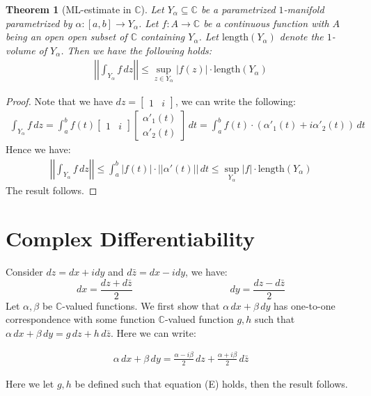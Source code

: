 \documentclass[11pt,oneside]{book}
\theoremstyle{break}
\theoremstyle{break}
\newtheorem{thm}{Theorem}[section]
\newcommand{\Complex}{\mathbb{C}}
\newcommand{\bmat}[1]{\begin{bmatrix} #1 \end{bmatrix}}
\begin{document}
\begin{thm}[ML-estimate in $\Complex$]
Let $Y_\alpha \subseteq \Complex$ be a parametrized $1$-manifold parametrized by $\alpha:[a,b] \to Y_\alpha$. Let $f:A \to \Complex$ be a continuous function with $A$ being an open open subset of $\Complex$ containing $Y_\alpha$. Let $\text{length}(Y_\alpha)$ denote the $1$-volume of $Y_\alpha$. Then we have the following holds:
\begin{align*}
\left|\left|\int_{Y_\alpha} f\, dz \right|\right| \leq \sup_{z \in Y_\alpha} |f(z)| \cdot \text{length}(Y_\alpha)
\end{align*}
\end{thm}
\begin{proof}
Note that we have $dz = \bmat{1&i}$, we can write the following:
\begin{align*}
\int_{Y_\alpha} f\, dz = \int_a^b f(t) \bmat{1 & i} \bmat{\alpha'_1(t) \\ \alpha'_2(t)} \, dt = \int_a^b f(t)\cdot (\alpha'_1(t) + i \alpha'_2(t))\, dt
\end{align*}
Hence we have:
\begin{align*}
\left|\left|\int_{Y_\alpha} f\, dz\right|\right| \leq \int_a^b |f(t)|\cdot ||\alpha'(t)||\, dt \leq \sup_{Y_\alpha} |f| \cdot \text{length}(Y_\alpha)
\end{align*}
The result follows.
\end{proof}



\newpage
\section[Complex Differentiability]{\color{red}Complex Differentiability\color{black}}

Consider $dz = dx+idy$ and $d\bar{z} = dx-idy$, we have: 
$$dx = \frac{dz+d\bar{z}}{2}\qquad\qquad\qquad\qquad\qquad dy = \frac{dz - d\bar{z}}{2}$$ 
Let $\alpha,\beta$ be $\Complex$-valued functions. We first show that $\alpha\, dx + \beta\, dy $ has one-to-one correspondence with some function $\Complex$-valued function $g,h$ such that $\alpha\, dx + \beta\, dy = g\, dz + h\, d\bar{z}$. Here we can write:

\begin{align*}
\alpha\, dx + \beta\, dy = \frac{\alpha-i\beta}{2} \, dz + \frac{\alpha + i\beta}{2}\, d\bar{z} \tag{E}
\end{align*}

Here we let $g,h$ be defined such that equation (E) holds, then the result follows.\\
\end{document}

